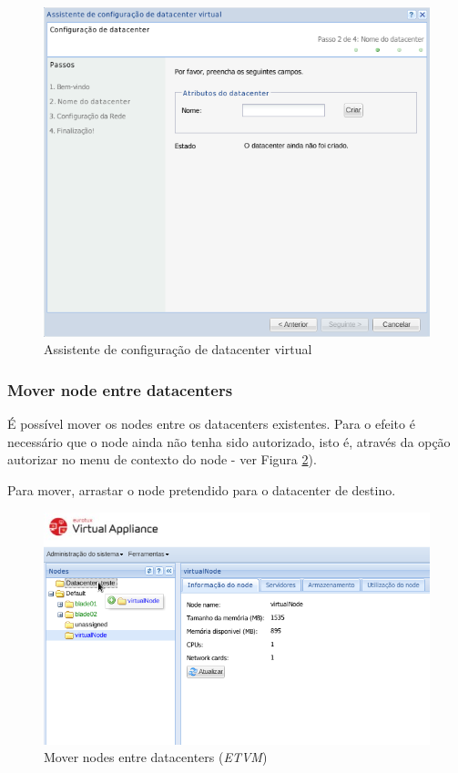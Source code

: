 {\begin{figure}[H]
        \begin{center}
        \includegraphics[scale=0.7]{screenshots/cluster_config.png}
        \caption{Assistente de configuração de datacenter virtual}
        \label{fig:cluster_config}
        \end{center}
\end{figure}

\subsubsection{Mover node entre datacenters}
É possível mover os nodes entre os datacenters existentes. Para o efeito é necessário que o node ainda não tenha sido autorizado, isto é, através da opção autorizar no menu de contexto do node - ver Figura \ref{fig:cluster-move}).

Para mover, arrastar o node pretendido para o datacenter de destino.

\begin{figure}[H]
        \begin{center}
        \includegraphics[scale=0.7]{screenshots/cluster-move.png}
        \caption{Mover nodes entre datacenters (\emph{ETVM})}
        \label{fig:cluster-move}
        \end{center}
\end{figure}

}
